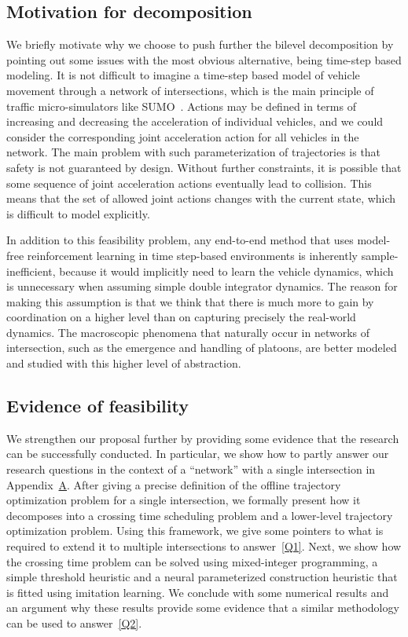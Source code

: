 \documentclass{article}
\theoremstyle{definition}
\theoremstyle{plain}
\begin{document}
\subsection{Motivation for decomposition}

We briefly motivate why we choose to push further the bilevel decomposition by
pointing out some issues with the most obvious alternative, being time-step
based modeling.
%
It is not difficult to imagine a time-step based model of vehicle movement through
a network of intersections, which is the main principle of traffic
micro-simulators like SUMO~\cite{lopezMicroscopicTrafficSimulation2018}. Actions may be defined in terms of increasing
and decreasing the acceleration of individual vehicles, and we could consider the
corresponding joint acceleration action for all vehicles in the network.
%
The main problem with such parameterization of trajectories is that safety is
not guaranteed by design. Without further constraints, it is possible that
some sequence of joint acceleration actions eventually lead to collision. This
means that the set of allowed joint actions changes with the current
state, which is difficult to model explicitly.

In addition to this feasibility problem, any end-to-end method that uses
model-free reinforcement learning in time step-based environments is inherently
sample-inefficient, because it would implicitly need to learn the vehicle
dynamics, which is unnecessary when assuming simple double integrator dynamics.
The reason for making this assumption is that we think that there is much more
to gain by coordination on a higher level than on capturing precisely the
real-world dynamics. The macroscopic phenomena that naturally occur in networks
of intersection, such as the emergence and handling of platoons, are better
modeled and studied with this higher level of abstraction.

\subsection{Evidence of feasibility}

We strengthen our proposal further by providing some evidence that the research can be
successfully conducted. In particular, we show how to partly answer our research
questions in the context of a ``network'' with a single intersection in
Appendix~\hyperref[A]{A}.
%
After giving a precise definition of the offline trajectory optimization problem
for a single intersection, we formally present how it decomposes into a crossing
time scheduling problem and a lower-level trajectory optimization problem. Using
this framework, we give some pointers to what is required to extend it to
multiple intersections to answer~\ref{Q1}.
%
Next, we show how the crossing time problem can be solved using
mixed-integer programming, a simple threshold heuristic and a neural
parameterized construction heuristic that is fitted using imitation learning. We
conclude with some numerical results and an argument why these results
provide some evidence that a similar methodology can be used to answer~\ref{Q2}.
\end{document}
